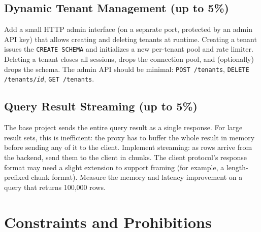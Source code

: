 \documentclass[11pt,a4paper]{article}
\begin{document}
\subsection{Dynamic Tenant Management (up to 5\%)}
Add a small HTTP admin interface (on a separate port, protected by an admin API key) that allows creating and deleting tenants at runtime. Creating a tenant issues the \texttt{CREATE SCHEMA} and initializes a new per-tenant pool and rate limiter. Deleting a tenant closes all sessions, drops the connection pool, and (optionally) drops the schema. The admin API should be minimal: \texttt{POST /tenants}, \texttt{DELETE /tenants/\textit{id}}, \texttt{GET /tenants}.

\subsection{Query Result Streaming (up to 5\%)}
The base project sends the entire query result as a single response. For large result sets, this is inefficient: the proxy has to buffer the whole result in memory before sending any of it to the client. Implement streaming: as rows arrive from the backend, send them to the client in chunks. The client protocol's response format may need a slight extension to support framing (for example, a length-prefixed chunk format). Measure the memory and latency improvement on a query that returns 100{,}000 rows.

\section{Constraints and Prohibitions}
\end{document}
